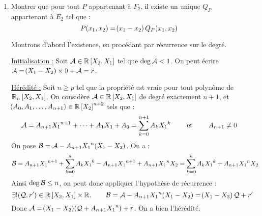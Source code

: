 \documentclass[a4paper,french,bookmarks]{article}
\begin{document}
    \begin{enumerate}
        \item Montrer que pour tout $P$ appartenant à $F_2$, il existe
        un unique $Q_P$ appartenant à $E_2$ tel que :
        \[ P\!\left(x_1, x_2\right) = \!\left(x_1 - x_2\right)Q_P\!\left(x_1, x_2\right)\]

        \noafter
        \nobefore
        \begin{nproof}
            Montrons d'abord l'existence, en procédant par récurrence sur le degré. 
            \begin{enumerate}
                \itast \underline{Initialisation :} Soit $\mathcal{A} \in \mathbb{R}\left[X_2, X_1\right]$
                tel que $\deg \mathcal{A} < 1$. On peut écrire $\mathcal{A} = \!\left(X_1 - X_2\right)\times 0 +
                \mathcal{A} = r$.
                    
                \itast \underline{Hérédité :} Soit $n \geq p$ tel que la propriété est
                vraie pour tout polynôme de $\mathbb{R}_n\left[X_2, X_1\right]$. On considère $\mathcal{A}
                \in \mathbb{R}\left[X_2, X_1\right]$ de degré exactement $n+1$, et $\!\left(A_0, A_1,
                \dots, A_{n+1}\right) \in \mathbb{R}\left[X_2\right]^{n+2}$ tels que :
                \[ \mathcal{A} = A_{n+1}{X_1}^{n+1} + \dots + A_1{X_1} + A_0 = \sum_{k=0}^{n+1}
                A_k{X_1}^k \qquad\ \text{et} \ \qquad A_{n+1} \neq 0\]
                On pose $\mathcal{B} = \mathcal{A} - A_{n+1}{X_1}^{n}\!\left(X_1 - X_2\right)$. On a :
                \[ \mathcal{B} = A_{n+1}{X_1}^{n+1} + \sum_{k=0}^n A_k{X_1}^k -
                A_{n+1}{X_1}^{n+1} + A_{n+1}{X_1}^nX_2 = \sum_{k=0}^n A_k{X_1}^k +
                A_{n+1}{X_1}^nX_2
                \]
                Ainsi $\deg \mathcal{B} \leq n$, on peut donc appliquer l'hypothèse de récurrence
                : 
                \[ \exists ! \!\left(\mathcal{Q}, r'\right) \in \mathbb{R}\left[X_2, X_1\right]\times \mathbb{R},\qquad 
                \mathcal{B} =  \mathcal{A} - A_{n+1}{X_1}^{n}\!\left(X_1 - X_2\right) = \!\left(X_1 - X_2\right)\mathcal{Q} + r'\]
                Donc $ \mathcal{A} = \!\left(X_1 - X_2\right)\!\left(\mathcal{Q} + A_{n+1}{X_1}^n\right) + r$. On a bien
                l'hérédité.
            \end{enumerate}
                

\end{nproof}
\end{enumerate}
\end{document}
